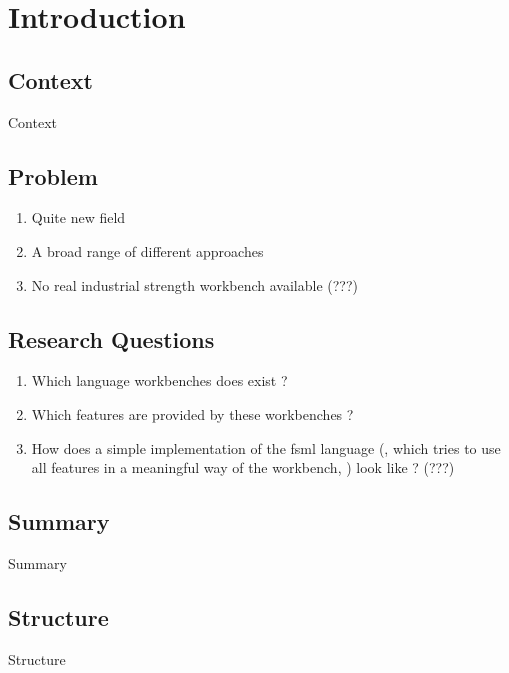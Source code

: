 \chapter{Introduction}

\section{Context}

Context

\newpage

\section{Problem}

\begin{enumerate}
  \item Quite new field
  \item A broad range of different approaches
  \item No real industrial strength workbench available (???)
\end{enumerate}

\newpage

\section{Research Questions}

\begin{enumerate}
  \item Which language workbenches does exist ?
  \item Which features are provided by these workbenches ?
  \item How does a simple implementation of the fsml language (, which tries to use all features in a meaningful way of the workbench, ) look like ? (???)
\end{enumerate}

\newpage

\section{Summary}

Summary

\newpage

\section{Structure}

Structure